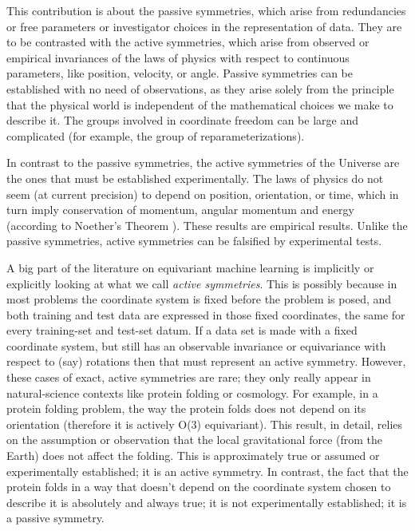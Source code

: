 \documentclass{article}
\theoremstyle{plain}
\theoremstyle{definition}
\theoremstyle{remark}
\begin{document}
This contribution is about the passive symmetries, which arise from redundancies or free parameters or investigator choices in the representation of data.
They are to be contrasted with the active symmetries, which arise from observed or empirical invariances of the laws of physics with respect to continuous parameters, like position, velocity, or angle.
Passive symmetries can be established with no need of observations, as they arise solely from the principle that the physical world is independent of the mathematical choices we make to describe it.
The groups involved in coordinate freedom can be large and complicated (for example, the group of reparameterizations).

In contrast to the passive symmetries, the active symmetries of the Universe are the ones that must be established experimentally.
The laws of physics do not seem (at current precision) to depend on position, orientation, or time, which in turn imply conservation of momentum, angular momentum and energy (according to Noether's Theorem \citealt{noether}).
These results are empirical results.
Unlike the passive symmetries, active symmetries can be falsified by experimental tests.
 
A big part of the literature on equivariant machine learning is implicitly or explicitly looking at what we call \emph{active symmetries}.
This is possibly because in most problems the coordinate system is fixed before the problem is posed, and both training and test data are expressed in those fixed coordinates, the same for every training-set and test-set datum.
If a data set is made with a fixed coordinate system, but still has an observable invariance or equivariance with respect to (say) rotations then that must represent an active symmetry.
However, these cases of exact, active symmetries are rare; they only really appear in natural-science contexts like protein folding or cosmology.
For example, in a protein folding problem, the way the protein folds does not depend on its orientation (therefore it is actively O(3) equivariant).
This result, in detail, relies on the assumption or observation that the local gravitational force (from the Earth) does not affect the folding.
This is approximately true or assumed or experimentally established; it is an active symmetry.
In contrast, the fact that the protein folds in a way that doesn't depend on the coordinate system chosen to describe it is absolutely and always true; it is not experimentally established; it is a passive symmetry.
\end{document}
